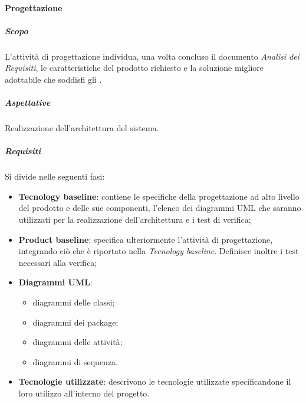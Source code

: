 			\paragraph{Progettazione}	
				\subparagraph{Scopo}
				L'attività di progettazione individua, una volta concluso il documento \textit{Analisi dei Requisiti}, le caratteristiche del prodotto richiesto e la soluzione migliore adottabile che soddisfi gli . 
				\subparagraph{Aspettative}
				Realizzazione dell'architettura del sistema.
				\subparagraph{Requisiti}
				Si divide nelle seguenti fasi:
				\begin{itemize}
					\item \textbf{Tecnology baseline}: contiene le specifiche della progettazione ad alto livello del prodotto e delle sue componenti, l'elenco dei diagrammi UML che saranno utilizzati per la realizzazione dell'architettura e i test di verifica;
					\item \textbf{Product baseline}: specifica ulteriormente l'attività di progettazione, integrando ciò che è riportato nella \textit{Tecnology baseline}. Definisce inoltre i test necessari alla verifica;
					\item \textbf{Diagrammi UML}:
					\begin{itemize}
						\item diagrammi delle classi;
						\item diagrammi dei package;
						\item diagrammi delle attività;
						\item diagrammi di sequenza.
					\end{itemize}
					\item \textbf{Tecnologie utilizzate}: descrivono le tecnologie utilizzate specificandone il loro utilizzo all'interno del progetto.
				\end{itemize}			
